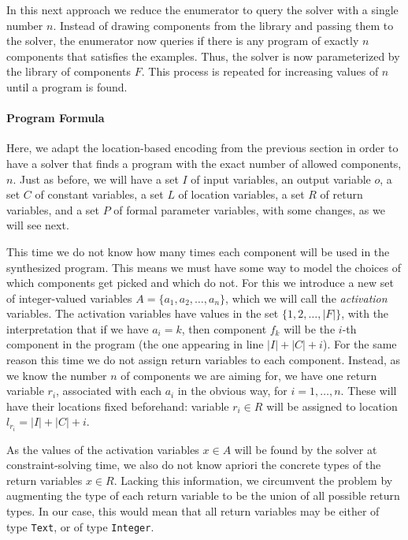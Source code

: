 In this next approach we reduce the enumerator to query the solver with a single
number $n$.
Instead of drawing components from the library and passing them to the solver,
the enumerator now queries if there is any program of exactly $n$ components
that satisfies the examples. Thus, the solver is now parameterized by the
library of components $F$. This process is repeated for increasing values of $n$
until a program is found.

\paragraph{Program Formula}
\label{sec:program-formula-whole}

Here, we adapt the location-based encoding from the previous section in order to
have a solver that finds a program with the exact number of allowed components,
$n$. 
Just as before, we will have a set $I$ of input variables, an output variable
$o$, a set $C$ of constant variables, a set $L$ of location variables, a set $R$
of return variables, and a set $P$ of formal parameter variables, with some
changes, as we will see next.

This time we do not know how many times each component will be used in the
synthesized program.
This means we must have some way to model the choices of which components get
picked and which do not.
For this we introduce a new set of integer-valued variables $A = \{a_1, a_2,
\ldots, a_n\}$, which we will call the \textit{activation} variables.
The activation variables have values in the set $\{1, 2, \ldots, |F|\}$, with
the interpretation that if we have $a_i = k$, then component $f_k$ will be the
$i$-th component in the program (the one appearing in line $|I| + |C| + i$).
For the same reason this time we do not assign return variables to each
component.
Instead, as we know the number $n$ of components we are aiming for, we have one
return variable $r_i$, associated with each $a_i$ in the obvious way, for
$i = 1, \ldots, n$.
These will have their locations fixed beforehand: variable $r_i \in R$ will be
assigned to location $l_{r_i} = |I| + |C| + i$.

As the values of the activation variables $x \in A$ will be found by the solver
at constraint-solving time, we also do not know apriori the concrete types of
the return variables $x \in R$.
Lacking this information, we circumvent the problem by augmenting the type of
each return variable to be the union of all possible return types.
In our case, this would mean that all return variables may be either of type
\lstinline{Text}, or of type \lstinline{Integer}.

